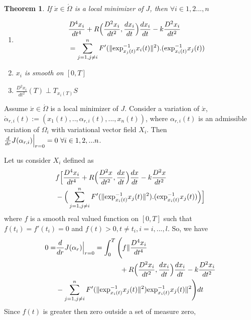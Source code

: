 \documentclass[letterpaper, 10 pt, conference]{ieeeconf}  %
\newtheorem{theorem}{Theorem}[section]
\begin{document}
\begin{theorem}\label{mainTh}
%
If $\acute{x} \in \acute{\Omega}$ is a local minimizer of $J$, then $ \forall i \in {1,2...,n} $
\begin{enumerate} %
\item \begin{align*}&\frac{D^4 x_i}{dt^4} + R \Big(\frac{D^2 x_i}{dt^2}, \frac{dx_i}{dt} \Big)\frac{dx_i}{dt} - k\frac{D^2x_i}{dt^2}\\ &= \sum\limits_{j=1 ,j\neq i}^{n} F'(\| \hbox{exp}_{x_j (t)}^{-1} x_i(t)\|^2).(\hbox{exp}^{-1}_{x_i (t)} x_j(t))\end{align*}
\item $x_i$ is smooth on $[0,T]$
\item $\frac{D^2x_i}{dt^2}(T) \perp T_{x_{i}(T)}S$
\end{enumerate}
%
\end{theorem}
%
\proof
Assume $\acute x \in \acute\Omega$ is a local minimizer of $J$. Consider a variation of $\acute x$, $\acute\alpha_{r,i}(t) := (x_1(t),.. ,\alpha_{r,i}(t),... ,x_n(t))$, where $\alpha_{r,i}(t)$ is an admissible variation of $\Omega_i$ with variational vector field $X_i$. Then $\frac{d}{dr}J(\alpha_{r,i})\Big{|}_{r=0} = 0 \ \forall i \in 1,2,...n$. \par
Let us consider $X_i$ defined as
%
\begin{align*}
 & f \Big[ \frac{D^4x_i}{dt^4} + R\Big(\frac{D^2x}{dt^2},\frac{dx}{dt}\Big)\frac{dx}{dt} - k\frac{D^2x}{dt^2}
\\
 & - \Big( \sum\limits_{j=1 ,j\neq i}^{n} F'(\| \hbox{exp}_{x_i (t)}^{-1} x_j(t)\|^2).(\hbox{exp}^{-1}_{x_i (t)} x_j(t)) \Big)  \Big]
\end{align*} where $f$ is a smooth real valued function on $[0,T]$ such that $f(t_i) = f'(t_i) = 0$ and $ f(t) > 0, t \neq t_i, i = i,...,l$.
So, we have \begin{align*}
%
0=&\frac{d}{dr}J(\alpha_r)\Big{|}_{r=0} = \int_0^T  \Bigg( f \| \frac{D^4x_i}{dt^4}\\& \hspace{3.2cm}+ R \Big( \frac{D^2x_i}{dt^2}, \frac{d x_i}{d t} \Big) \frac{dx_i}{dt}- k\frac{D^2x_i}{dt^2}
\\
&- \sum\limits_{j=1, j \neq i}^{n} F'(\| \hbox{exp}^{-1}_{x_{i}(t)}x_j(t)\|^2)\hbox{exp}^{-1}_{x_{i}(t)}x_j(t) \|^2  \Bigg) dt
%
\end{align*}
%
Since $f(t)$ is greater then zero outside a set of measure zero,
\end{document}
